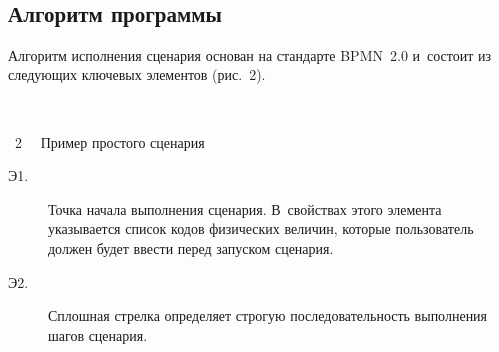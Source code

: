 \begin{multicols}{2}
\setcounter{figure}{3}
\begin{figure*}[b] %
\vspace*{-9pt}
  \begin{center}  
    \mbox{%
\epsfxsize=163mm
}

\end{center}
\vspace*{-9pt}
\end{figure*}

\vspace*{-10pt}
   
    \subsection*{Алгоритм программы}
    
    \vspace*{-2pt}
    
    Алгоритм исполнения сценария основан на стандарте BPMN~2.0 и~со\-сто\-ит из 
сле\-ду\-ющих ключевых элементов (рис.~2).

{ \begin{center}  %
 \vspace*{6pt}
    \mbox{%
\epsfxsize=70.82mm
}

\vspace*{6pt}

\noindent
{{\figurename~2}\ \ \small{
Пример простого сценария
}}
\end{center}
}


\noindent
\begin{description}
\item[Э1.]  Точка начала выполнения сценария. В~свойствах этого элемента 
указывается список кодов физических величин, которые пользователь дол\-жен 
будет ввес\-ти перед запуском сценария.

\item[Э2.] Сплошная стрелка определяет строгую по\-сле\-до\-ва\-тель\-ность 
выполнения шагов сценария.

 \begin{figure*}[b] %
  \vspace*{1pt}
  \begin{center}  
    \mbox{%
\epsfxsize=131mm %
}

\end{center}
\vspace*{-9pt}
  \end{figure*}


\end{description}
\end{multicols}
